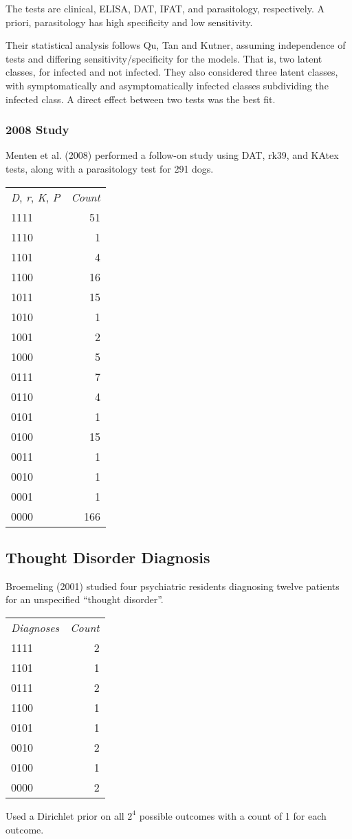 The tests are clinical, ELISA, DAT, IFAT, and parasitology,
respectively.  A priori, parasitology has high specificity and low
sensitivity.

Their statistical analysis follows Qu, Tan and Kutner, assuming
independence of tests and differing sensitivity/specificity for the
models.  That is, two latent classes, for infected and not infected.
They also considered three latent classes, with symptomatically and
asymptomatically infected classes subdividing the infected class.
A direct effect between two tests was the best fit.


\subsubsection{2008 Study}

Menten et al. (2008) performed a follow-on study using DAT, rk39, and
KAtex tests, along with a parasitology test for 291 dogs.

\begin{tabular}{lr}
{\it D}, {\it r}, {\it K}, {\it P} & {\it Count} \\
1111 & 51 \\
1110 & 1 \\
1101 & 4 \\
1100 & 16 \\
1011 & 15 \\
1010 & 1 \\
1001 & 2 \\
1000 & 5 \\
0111 & 7 \\
0110 & 4 \\
0101 & 1 \\
0100 & 15 \\
0011 & 1 \\
0010 & 1 \\
0001 & 1 \\
0000 & 166
\end{tabular}

\subsection{Thought Disorder Diagnosis}

Broemeling (2001) studied four psychiatric residents diagnosing twelve
patients for an unspecified ``thought disorder''.

\begin{tabular}{lr}
{\it Diagnoses} & {\it Count} \\
1111 & 2 \\
1101 & 1 \\
0111 & 2 \\
1100 & 1 \\
0101 & 1 \\
0010 & 2 \\
0100 & 1 \\
0000 & 2 \\
\end{tabular}

Used a Dirichlet prior on all $2^4$ possible outcomes with
a count of 1 for each outcome.

